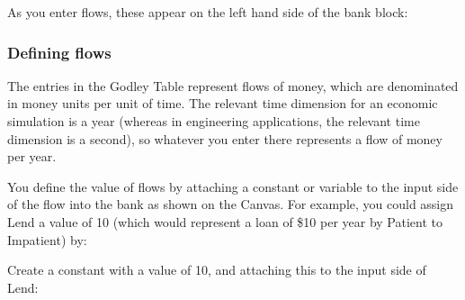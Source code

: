 As you enter flows, these appear on the left hand side of the bank
block:
\begin{center}
\par\end{center}

\subsubsection{Defining flows}

The entries in the Godley Table represent flows of money, which are
denominated in money units per unit of time. The relevant time dimension
for an economic simulation is a year (whereas in engineering applications,
the relevant time dimension is a second), so whatever you enter there
represents a flow of money per year.

You define the value of flows by attaching a constant or variable
to the input side of the flow into the bank as shown on the Canvas.
For example, you could assign Lend a value of 10 (which would represent
a loan of \$10 per year by Patient to Impatient) by:

Create a constant with a value of 10, and attaching this to the input
side of Lend:
\begin{center}
\par\end{center}


